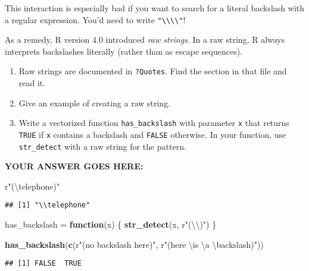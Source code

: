 \documentclass[
]{article}
\newenvironment{Shaded}{\begin{snugshade}}{\end{snugshade}}
\newcommand{\CharTok}[1]{\textcolor[rgb]{0.31,0.60,0.02}{#1}}
\newcommand{\ControlFlowTok}[1]{\textcolor[rgb]{0.13,0.29,0.53}{\textbf{#1}}}
\newcommand{\KeywordTok}[1]{\textcolor[rgb]{0.13,0.29,0.53}{\textbf{#1}}}
\newcommand{\NormalTok}[1]{#1}
\newcommand{\StringTok}[1]{\textcolor[rgb]{0.31,0.60,0.02}{#1}}
\begin{document}
This interaction is especially bad if you want to search for a literal
backslash with a regular expression. You'd need to write
\texttt{"\textbackslash{}\textbackslash{}\textbackslash{}\textbackslash{}"}!

As a remedy, R version 4.0 introduced \emph{raw strings}. In a raw
string, R always interprets backslashes literally (rather than as escape
sequences).

\begin{enumerate}
\def\labelenumi{\arabic{enumi}.}
\item
  Raw strings are documented in \texttt{?Quotes}. Find the section in
  that file and read it.
\item
  Give an example of creating a raw string.
\item
  Write a vectorized function \texttt{has\_backslash} with parameter
  \texttt{x} that returns \texttt{TRUE} if \texttt{x} contains a
  backslash and \texttt{FALSE} otherwise. In your function, use
  \texttt{str\_detect} with a raw string for the pattern.
\end{enumerate}

\textbf{YOUR ANSWER GOES HERE:}

\begin{Shaded}
\begin{Highlighting}[]
\NormalTok{r}\StringTok{"(}\CharTok{\textbackslash{}t}\StringTok{elephone)"}
\end{Highlighting}
\end{Shaded}

\begin{verbatim}
## [1] "\\telephone"
\end{verbatim}

\begin{Shaded}
\begin{Highlighting}[]
\NormalTok{has\_backslash =}\StringTok{ }\ControlFlowTok{function}\NormalTok{(x) \{}
   \KeywordTok{str\_detect}\NormalTok{(x, r}\StringTok{"(}\CharTok{\textbackslash{}\textbackslash{}}\StringTok{)"}\NormalTok{)}
\NormalTok{\}}

\KeywordTok{has\_backslash}\NormalTok{(}\KeywordTok{c}\NormalTok{(r}\StringTok{"(no backslash here)"}\NormalTok{, r}\StringTok{"(here \textbackslash{}is }\CharTok{\textbackslash{}a}\StringTok{ }\CharTok{\textbackslash{}b}\StringTok{ackslash)"}\NormalTok{))}
\end{Highlighting}
\end{Shaded}

\begin{verbatim}
## [1] FALSE  TRUE
\end{verbatim}
\end{document}
